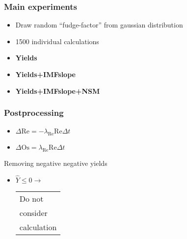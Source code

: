 \begin{frame}
\frametitle{Main experiments }
\begin{itemize}
\item Draw random ``fudge-factor'' from gaussian distribution
\item 1500 individual calculations
\item \textbf{Yields}
\item \textbf{Yields+IMFslope}
\item \textbf{Yields+IMFslope+NSM}
\end{itemize}
\end{frame}

\begin{frame}
  \frametitle{Postprocessing}
  \begin{minipage}[t][1cm][t]{0.45\linewidth}
    \betadecay
    \begin{itemize}
      \item $\Delta \mathrm{Re} = -\lambda_{\scriptscriptstyle \mathrm{Re}} \mathrm{Re} \Delta t$
      \item $\Delta \mathrm{Os} = \lambda_{\scriptscriptstyle \mathrm{Re}} \mathrm{Re} \Delta t$
    \end{itemize}
  \end{minipage}
  \hfill
  \begin{minipage}[t][1cm][t]{0.45\linewidth}
    Removing negative negative yields
    \begin{itemize}
      \item $\hat{Y} \leq 0 \rightarrow$ \begin{tabular}{l}Do not \\ consider \\ calculation \end{tabular}
    \end{itemize}
  \end{minipage}
\end{frame}
